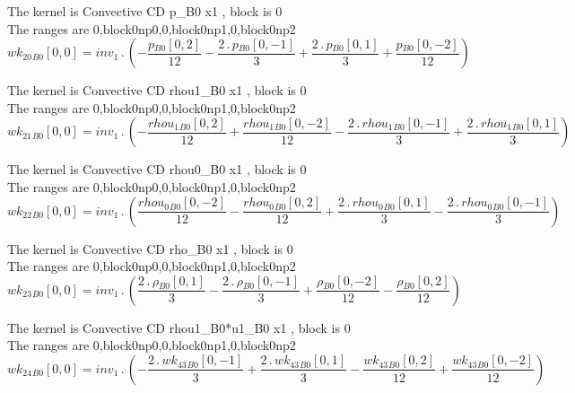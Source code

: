 \documentclass{article}
\begin{document}
\noindent The kernel is Convective CD p_B0 x1 , block is 0\\\noindent The ranges are 0,block0np0,0,block0np1,0,block0np2\\\begin{dmath}{wk_{20}{_{B0}}}[{0,0}] = inv_1 \,.\, \left(- \frac{{p{_{B0}}}[{0,2}]}{12} - \frac{2 \,.\, {p{_{B0}}}[{0,-1}]}{3} + \frac{2 \,.\, {p{_{B0}}}[{0,1}]}{3} + \frac{{p{_{B0}}}[{0,-2}]}{12}\right)\end{dmath}

\noindent The kernel is Convective CD rhou1_B0 x1 , block is 0\\\noindent The ranges are 0,block0np0,0,block0np1,0,block0np2\\\begin{dmath}{wk_{21}{_{B0}}}[{0,0}] = inv_1 \,.\, \left(- \frac{{rhou_{1}{_{B0}}}[{0,2}]}{12} + \frac{{rhou_{1}{_{B0}}}[{0,-2}]}{12} - \frac{2 \,.\, {rhou_{1}{_{B0}}}[{0,-1}]}{3} + \frac{2 \,.\, {rhou_{1}{_{B0}}}[{0,1}]}{3}\right)\end{dmath}

\noindent The kernel is Convective CD rhou0_B0 x1 , block is 0\\\noindent The ranges are 0,block0np0,0,block0np1,0,block0np2\\\begin{dmath}{wk_{22}{_{B0}}}[{0,0}] = inv_1 \,.\, \left(\frac{{rhou_{0}{_{B0}}}[{0,-2}]}{12} - \frac{{rhou_{0}{_{B0}}}[{0,2}]}{12} + \frac{2 \,.\, {rhou_{0}{_{B0}}}[{0,1}]}{3} - \frac{2 \,.\, {rhou_{0}{_{B0}}}[{0,-1}]}{3}\right)\end{dmath}

\noindent The kernel is Convective CD rho_B0 x1 , block is 0\\\noindent The ranges are 0,block0np0,0,block0np1,0,block0np2\\\begin{dmath}{wk_{23}{_{B0}}}[{0,0}] = inv_1 \,.\, \left(\frac{2 \,.\, {\rho{_{B0}}}[{0,1}]}{3} - \frac{2 \,.\, {\rho{_{B0}}}[{0,-1}]}{3} + \frac{{\rho{_{B0}}}[{0,-2}]}{12} - \frac{{\rho{_{B0}}}[{0,2}]}{12}\right)\end{dmath}

\noindent The kernel is Convective CD rhou1_B0*u1_B0 x1 , block is 0\\\noindent The ranges are 0,block0np0,0,block0np1,0,block0np2\\\begin{dmath}{wk_{24}{_{B0}}}[{0,0}] = inv_1 \,.\, \left(- \frac{2 \,.\, {wk_{43}{_{B0}}}[{0,-1}]}{3} + \frac{2 \,.\, {wk_{43}{_{B0}}}[{0,1}]}{3} - \frac{{wk_{43}{_{B0}}}[{0,2}]}{12} + \frac{{wk_{43}{_{B0}}}[{0,-2}]}{12}\right)\end{dmath}
\end{document}
